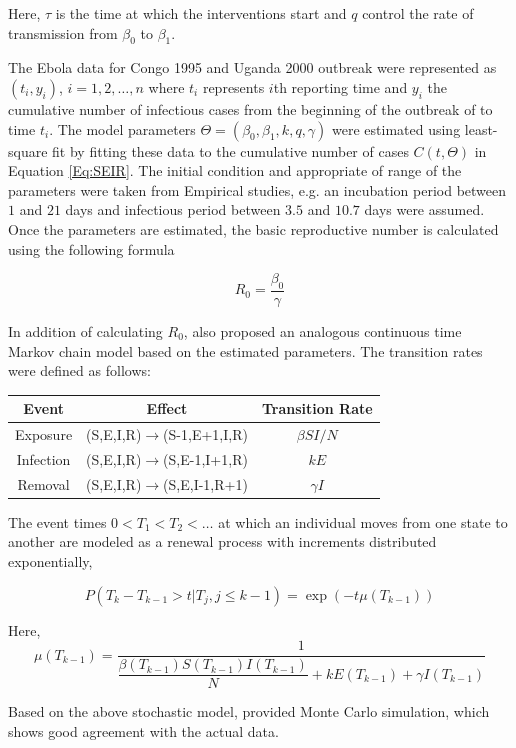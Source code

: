 \documentclass[10pt, journal,onecolumn]{IEEEtran}
\begin{document}
Here, $\tau$ is the time at which the interventions start and $q$ control the rate of transmission from $\beta_0$ to $\beta_1$.

The Ebola data for Congo 1995 and Uganda 2000 outbreak were represented as $(t_i,y_i)$, $i=1,2,\ldots,n$ where $t_i$ represents $i$th reporting time and $y_i$ the cumulative number of infectious cases from the beginning of the outbreak of to time $t_i$.  The model parameters $\Theta=(\beta_0,\beta_1,k,q,\gamma)$ were estimated using least-square fit by fitting these data to the cumulative number of cases $C(t,\Theta)$ in Equation \ref{Eq:SEIR}. The initial condition and appropriate of range of the parameters were taken from Empirical studies, e.g. an incubation period between $1$ and $21$ days and infectious period between $3.5$ and $10.7$ days were assumed. Once the parameters are estimated, the basic reproductive number is calculated using the following formula

\begin{equation}
R_0 = \dfrac{\beta_0}{\gamma}
\end{equation}


In addition of calculating $R_0$, \citep{chowell2004basic} also proposed an analogous continuous time Markov chain model based on the estimated parameters. The transition rates were defined as follows:

\begin{center}
\begin{tabular}{|c|c|c|}
\hline 
Event & Effect & Transition Rate\tabularnewline
\hline 
\hline 
Exposure & (S,E,I,R)$\to$(S-1,E+1,I,R) & $\beta SI/N$\tabularnewline
\hline 
Infection & (S,E,I,R)$\to$(S,E-1,I+1,R) & $kE$\tabularnewline
\hline 
Removal & (S,E,I,R)$\to$(S,E,I-1,R+1) & $\gamma I$\tabularnewline
\hline 
\end{tabular}
\end{center}


The event times $0<T_1<T_2<\ldots$ at which an individual moves from one state to another are modeled as a renewal process with increments distributed exponentially,

\begin{equation}
P(T_k-T_{k-1} > t | T_j, j\leq k-1) = \exp(-t \mu (T_{k-1}) )
\end{equation}

Here, 
\[
\mu (T_{k-1}) = \frac{1}{\dfrac{\beta(T_{k-1}) S(T_{k-1}) I(T_{k-1})}{N} + k E(T_{k-1}) + \gamma I(T_{k-1})}
\]

Based on the above stochastic model, \citep{chowell2004basic} provided Monte Carlo simulation, which shows good agreement with the actual data.
\end{document}
